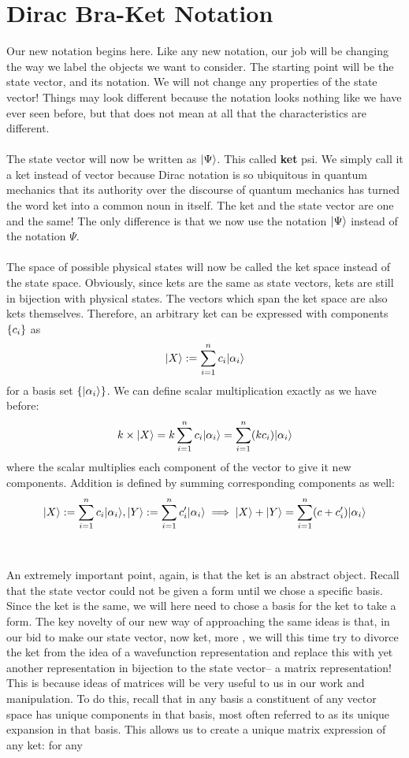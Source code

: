 \section{Dirac Bra-Ket Notation}
Our new notation begins here. Like any new notation, our job will be changing the way we label the objects we want to consider. The starting point will be the state vector, and its notation. We will not change any properties of the state vector! Things may look different because the notation looks nothing like we have ever seen before, but that does not mean at all that the characteristics are different.
\\\\
The state vector will now be written as $|\Psi\rangle$. This called \textbf{ket} psi. We simply call it a ket instead of vector because Dirac notation is so ubiquitous in quantum mechanics that its authority over the discourse of quantum mechanics has turned the word ket into a  common noun in itself. The ket and the state vector are one and the same! The only difference is that we now use the notation $|\Psi\rangle$ instead of the notation $\Psi$. 
\\\\
The space of possible physical states will now be called the ket space instead of the state space. Obviously, since kets are the same as state vectors, kets are still in bijection with physical states. The vectors which span the ket space are also kets themselves. Therefore, an arbitrary ket can be expressed with components $\{c_{i}\}$ as $$|X\rangle:=\sum_{i=1}^{n}c_{i}|\alpha_{i}\rangle$$ for a basis set $\{|\alpha_{i}\rangle\}$. We can define scalar multiplication exactly as we have before:
$$
k\times|X\rangle=k\sum_{i=1}^{n}c_{i}|\alpha_{i}\rangle=\sum_{i=1}^{n}(kc_{i})|\alpha_{i}\rangle
$$
where the scalar multiplies each component of the vector to give it new components. Addition is defined by summing corresponding components as well:
$$
|X\rangle:=\sum_{i=1}^{n}c_{i}|\alpha_{i}\rangle, |Y\rangle:=\sum_{i=1}^{n}c'_{i}|\alpha_{i}\rangle\implies |X\rangle+|Y\rangle=\sum_{i=1}^{n}(c+c'_{i})|\alpha_{i}\rangle
$$
\\\\
An extremely important point, again, is that the ket is an abstract object. Recall that the state vector could not be given a form until we chose a specific basis. Since the ket is the same, we will here need to chose a basis for the ket to take a form. The key novelty of our new way of approaching the same ideas is that, in our bid to make our state vector, now ket, more , we will this time try to divorce the ket from the idea of a wavefunction representation and replace this with yet another representation in bijection to the state vector-- a matrix representation! This is because ideas of matrices will be very useful to us in our work and manipulation. To do this, recall that in any basis a constituent of any vector space has unique components in that basis, most often referred to as its unique expansion in that basis. This allows us to create a unique matrix expression of any ket: for any
